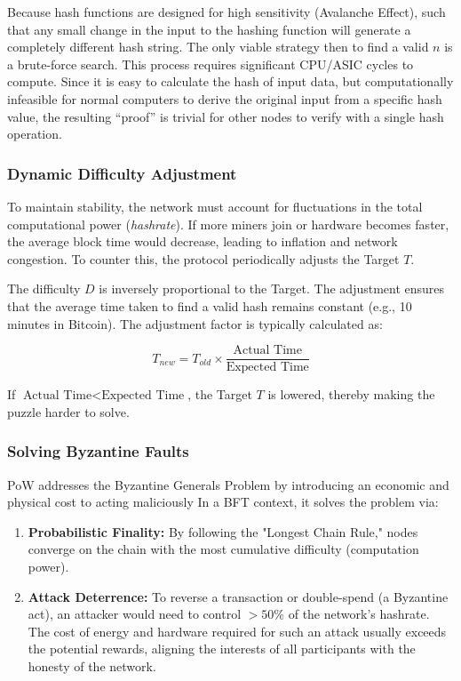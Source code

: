 Because hash functions are designed for high sensitivity (Avalanche Effect), such that any small change in the input to the hashing function will generate a completely different hash string. The only viable strategy then to find a valid $n$ is a brute-force search. This process requires significant CPU/ASIC cycles to compute. Since it is easy to calculate the hash of input data, but computationally infeasible for normal computers to derive the original input from a specific hash value, the resulting “proof” is trivial for other nodes to verify with a single hash operation.

\subsubsection{Dynamic Difficulty Adjustment}
To maintain stability, the network must account for fluctuations in the total computational power (\textit{hashrate}). If more miners join or hardware becomes faster, the average block time would decrease, leading to inflation and network congestion. To counter this, the protocol periodically adjusts the Target $T$.

The difficulty $D$ is inversely proportional to the Target. The adjustment ensures that the average time taken to find a valid hash remains constant (e.g., 10 minutes in Bitcoin). The adjustment factor is typically calculated as:

\begin{equation}
    T_{new} = T_{old} \times \frac{\text{Actual Time}}{\text{Expected Time}}
\end{equation}

If $\text{Actual Time} < \text{Expected Time}$, the Target $T$ is lowered, thereby making the puzzle harder to solve.

\subsubsection{Solving Byzantine Faults}
PoW addresses the Byzantine Generals Problem by introducing an economic and physical cost to acting maliciously In a BFT context, it solves the problem via:
\begin{enumerate}
    \item \textbf{Probabilistic Finality:} By following the "Longest Chain Rule," nodes converge on the chain with the most cumulative difficulty (computation power). 
    \item \textbf{Attack Deterrence:} To reverse a transaction or double-spend (a Byzantine act), an attacker would need to control $>50\%$ of the network's hashrate. The cost of energy and hardware required for such an attack usually exceeds the potential rewards, aligning the interests of all participants with the honesty of the network.
\end{enumerate}

